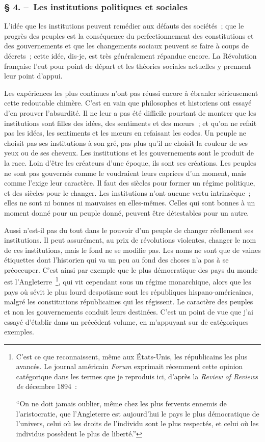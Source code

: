 \documentclass[french,twoside]{book} %
\begin{document}
\subsubsection[{§ 4. – Les institutions politiques et sociales}]{§ 4. – Les institutions politiques et sociales}
\noindent L’idée que les institutions peuvent remédier aux défauts des sociétés ; que le progrès des peuples est la conséquence du perfectionnement des constitutions et des gouvernements et que les changements sociaux peuvent se faire à coups de décrets ; cette idée, dis-je, est très généralement répandue encore. La Révolution française l’eut pour point de départ et les théories sociales actuelles y prennent leur point d’appui.\par
Les expériences les plus continues n’ont pas réussi encore à ébranler sérieusement cette redoutable chimère. C’est en vain que philosophes et historiens ont essayé d’en prouver l’absurdité. Il ne leur a pas été difficile pourtant de montrer que les institu­tions sont filles des idées, des sentiments et des mœurs ; et qu’on ne refait pas les idées, les sentiments et les mœurs en refaisant les codes. Un peuple ne choisit pas ses institutions à son gré, pas plus qu’il ne choisit la couleur de ses yeux ou de ses cheveux. Les institutions et les gouvernements sont le produit de la race. Loin d’être les créateurs d’une époque, ils sont ses créations. Les peuples ne sont pas gouvernés comme le voudraient leurs caprices d’un moment, mais comme l’exige leur caractère. Il faut des siècles pour former un régime politique, et des siècles pour le changer. Les institutions n’ont aucune vertu intrinsèque ; elles ne sont ni bonnes ni mauvaises en elles-mêmes. Celles qui sont bonnes à un moment donné pour un peuple donné, peuvent être détestables pour un autre.\par
Aussi n’est-il pas du tout dans le pouvoir d’un peuple de changer réellement ses institutions. Il peut assurément, au prix de révolutions violentes, changer le nom de ces institutions, mais le fond ne se modifie pas. Les noms ne sont que de vaines éti­quettes dont l’historien qui va un peu au fond des choses n’a pas à se préoccuper. C’est ainsi par exemple que le plus démocratique des pays du monde est l’Angleterre \footnote{ \noindent C’est ce que reconnaissent, même aux États-Unis, les républicains les plus avancés. Le journal américain \emph{Forum} exprimait récemment cette opinion catégorique dans les termes que je reproduis ici, d’après la \emph{Review of Reviews de} décembre 1894 :\par
 “On ne doit jamais oublier, même chez les plus fervents ennemis de l’aristocratie, que l’Angleterre est aujourd’hui le pays le plus démocratique de l’univers, celui où les droits de l’individu sont le plus respectés, et celui où les individus possèdent le plus de liberté.”
}, qui vit cependant sous un régime monarchique, alors que les pays où sévit le plus lourd despotisme sont les républiques hispano-américaines, malgré les constitutions répu­blicaines qui les régissent. Le caractère des peuples et non les gouvernements conduit leurs destinées. C’est un point de vue que j’ai essayé d’établir dans un précédent volu­me, en m’appuyant sur de catégoriques exemples.\par
\end{document}

